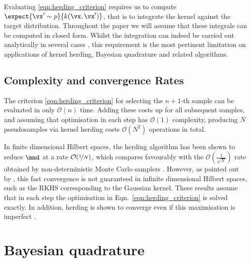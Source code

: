 Evaluating \eqref{eqn:herding_criterion} requires us to compute $\expect{\vx' \sim p}{k(\vx, \vx')} $, that is to integrate the kernel against the target distribution. Throughout the paper we will assume that these integrals can be computed in closed form. Whilst the integration can indeed be carried out analytically in several cases \citep{Song2008,Chen2010}, this requirement is the most pertinent limitation on applications of kernel herding, Bayesian quadrature and related algorithms.

\subsection{Complexity and convergence Rates}

The criterion \eqref{eqn:herding_criterion} for selecting the $n+1$-th sample can be evaluated in only $\mathcal{O}(n)$ time. Adding these costs up for all subsequent samples, and assuming that optimisation in each step has $\mathcal{O}(1)$ complexity, producing $N$ pseudosamples via kernel herding costs $\mathcal{O}(N^2)$ operations in total.

In finite dimensional Hilbert spaces, the herding algorithm has been shown to reduce $\mmd$ at a rate $\mathcal{O}(\nicefrac{1}{N})$, which compares favourably with the $\mathcal{O}(\frac{1}{\sqrt{N}})$ rate obtained by non-deterministic Monte Carlo samplers \citep{Chen2010,Bach2012}. However, as pointed out by \citep{Bach2012}, this fast convergence is not guaranteed in infinite dimensional Hilbert spaces, such as the RKHS corresponding to the Gaussian kernel. These results assume that in each step the optimisation in Eqn.\ \ref{eqn:herding_criterion} is solved exactly. In addition, herding is shown to converge even if this maximisation is imperfect \citep{Gelfand2010}.


\section{Bayesian quadrature} 


